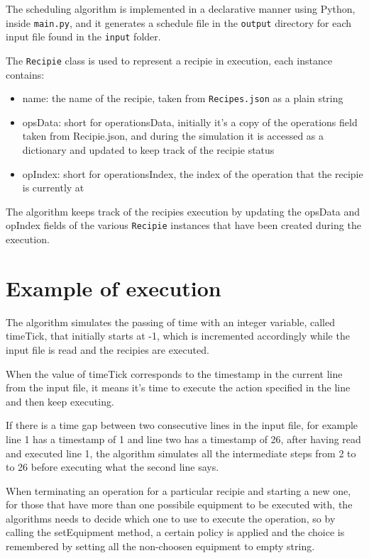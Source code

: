 \documentclass[12pt]{article}
\newcommand{\code}[1]{\colorbox{light-gray}{\texttt{#1}}}
\begin{document}
The scheduling algorithm is implemented in a declarative manner using Python, inside \code{main.py}, and it generates a schedule file in the \code{output} directory for each input file found in the \code {input} folder.

The \code{Recipie} class is used to represent a recipie in execution, each instance contains:
\begin{itemize}
\item name: the name of the recipie, taken from \code{Recipes.json} as a plain string
\item opsData: short for operationsData, initially it's a copy of the operations field taken from Recipie.json, and during the simulation it is accessed as a dictionary and updated to keep track of the recipie status
\item opIndex: short for operationsIndex, the index of the operation that the recipie is currently at
\end{itemize}
The algorithm keeps track of the recipies execution by updating the opsData and opIndex fields of the various \code{Recipie} instances that have been created during the execution.

\section{Example of execution}
The algorithm simulates the passing of time with an integer variable, called timeTick, that initially starts at -1, which is incremented accordingly while the input file is read and the recipies are executed.

When the value of timeTick corresponds to the timestamp in the current line from the input file, it means it's time to execute the action specified in the line and then keep executing.

If there is a time gap between two consecutive lines in the input file, for example line 1 has a timestamp of 1 and line two has a timestamp of 26, after having read and executed line 1, the algorithm simulates all the intermediate steps from 2 to to 26 before executing what the second line says.

When terminating an operation for a particular recipie and starting a new one, for those that have more than one possibile equipment to be executed with, the algorithms needs to decide which one to use to execute the operation, so by calling the setEquipment method, a certain policy is applied and the choice is remembered by setting all the non-choosen equipment to empty string.
\end{document}
